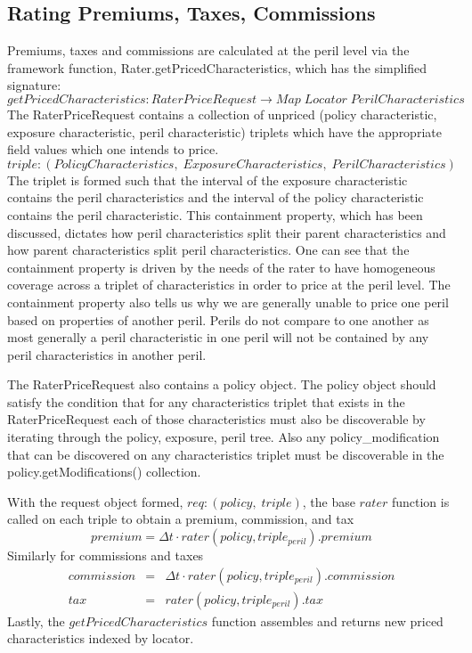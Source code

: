 
\subsection{Rating Premiums, Taxes, Commissions}
Premiums, taxes and commissions are calculated at the peril level via the framework function, Rater.getPricedCharacteristics,
which has the simplified signature:
\begin{equation*}
  getPricedCharacteristics: RaterPriceRequest \to Map \; Locator \; PerilCharacteristics
\end{equation*}
The RaterPriceRequest contains a collection of unpriced (policy characteristic, exposure characteristic, peril characteristic) triplets
which have the appropriate field values which one intends to price.
\begin{equation*}
triple: (PolicyCharacteristics, \; ExposureCharacteristics, \; PerilCharacteristics)
\end{equation*}
The triplet is formed such that the interval of the
exposure characteristic contains the peril characteristics and the interval of the policy characteristic contains the
peril characteristic. This containment property, which has been discussed, dictates how peril characteristics split
their parent characteristics and how parent characteristics split peril characteristics. One can see that the containment property
is driven by the needs of the rater to have homogeneous coverage across a triplet of characteristics in order to price at the peril
level. The containment property also tells us why we are generally unable to price one peril based on properties of another peril.
Perils do not compare to one another as most generally a peril characteristic in one peril will not be contained by any
peril characteristics in another peril.

The RaterPriceRequest also contains a policy object. The policy object should satisfy the condition that for any
characteristics triplet that exists in the RaterPriceRequest each of those characteristics must also be discoverable by
iterating through the policy, exposure, peril tree. Also any policy\_modification that can be discovered on any
characteristics triplet must be discoverable in the policy.getModifications() collection.

With the request object formed, $req: (policy, \; triple)$, the base $rater$ function is called on each triple to obtain
a premium, commission, and tax
\begin{equation*}
premium = \Delta t \cdot rater(policy, triple_{peril}).premium
\end{equation*}
Similarly for commissions and taxes
\begin{eqnarray*}
commission & = & \Delta t \cdot rater(policy, triple_{peril}).commission \\
tax & = & rater(policy, triple_{peril}).tax
\end{eqnarray*}
Lastly, the $getPricedCharacteristics$ function assembles and returns new priced characteristics indexed by locator.

